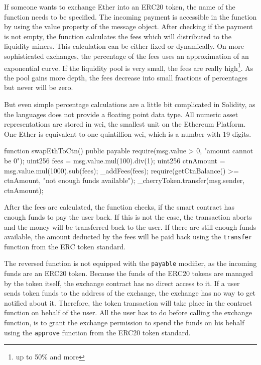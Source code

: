 If someone wants to exchange Ether into an ERC20 token, the name of the function needs to be specified. The incoming payment is accessible in the function by using the value property of the message object. After checking if the payment is not empty, the function calculates the fees which will distributed to the liquidity miners. This calculation can be either fixed or dynamically. On more sophisticated exchanges, the percentage of the fees uses an approximation of an exponential curve. If the liquidity pool is very small, the fees are really high\footnote{up to 50\% and more}. As the pool gains more depth, the fees decrease into small fractions of percentages but never will be zero.

But even simple percentage calculations are a little bit complicated in Solidity, as the languages does not provide a floating point data type. All numeric asset representations are stored in wei, the smallest unit on the Ethereum Platform. One Ether is equivalent to one quintillion wei, which is a number with 19 digits.

\begin{GenericCode}
function swapEthToCtn() public payable {
  require(msg.value > 0, "amount cannot be 0");
  uint256 fees = msg.value.mul(100).div(1);
  uint256 ctnAmount = msg.value.mul(1000).sub(fees);
  _addFees(fees);
  require(getCtnBalance() >= ctnAmount, "not enough funds available");
  _cherryToken.transfer(msg.sender, ctnAmount);
  }	
\end{GenericCode}

After the fees are calculated, the function checks, if the smart contract has enough funds to pay the user back. If this is not the case, the transaction aborts and the money will be transferred back to the user. If there are still enough funds available, the amount deducted by the fees will be paid back using the \texttt{transfer} function from the ERC token standard.

The reversed function is not equipped with the \texttt{payable} modifier, as the incoming funds are an ERC20 token. Because the funds of the ERC20 tokens are managed by the token itself, the exchange contract has no direct access to it. If a user sends token funds to the address of the exchange, the exchange has no way to get notified about it. Therefore, the token transaction will take place in the contract function on behalf of the user. All the user has to do before calling the exchange function, is to grant the exchange permission to spend the funds on his behalf using the \texttt{approve} function from the ERC20 token standard.

